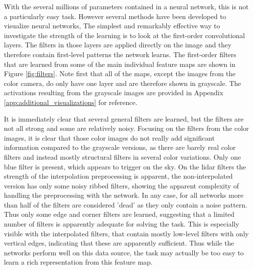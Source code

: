 With the several millions of parameters contained in a neural network, this is not a particularly easy task. However several methods have been developed to visualize neural networks,  The simplest and remarkably effective way to investigate the strength of the learning is to look at the first-order convolutional layers. The filters in those layers are applied directly on the image and they therefore contain first-level patterns the network learns. The first-order filters that are learned from some of the main individual feature maps are shown in Figure \ref{fig:filters}. Note first that all of the maps, except the images from the color camera, do only have one layer and are therefore shown in grayscale. The activations resulting from the grayscale images are provided in Appendix \ref{app:additional_visualizations} for reference.

It is immediately clear that several general filters are learned, but the filters are not all strong and some are relatively noisy. Focusing on the filters from the color images, it is clear that those color images do not really add significant information compared to the grayscale versions, as there are barely real color filters and instead mostly structural filters in several color variations. Only one blue filter is present, which appears to trigger on the sky. On the lidar filters the strength of the interpolation preprocessing is apparent, the non-interpolated version has only some noisy ribbed filters, showing the apparent complexity of handling the preprocessing with the network. In any case, for all networks more than half of the filters are considered 'dead' as they only contain a noise pattern. Thus only some edge and corner filters are learned, suggesting that a limited number of filters is apparently adequate for solving the task. This is especially visible with the interpolated filters, that contain mostly low-level filters with only vertical edges, indicating that these are apparently sufficient. Thus while the networks perform well on this data source, the task may actually be too easy to learn a rich representation from this feature map.

